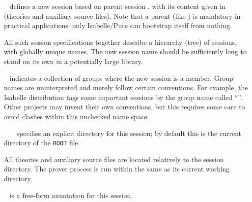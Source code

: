 \begin{isabellebody}
\begin{isamarkuptext}
  \begin{description}

  \item {}~ defines a new
  session  based on parent session , with its
  content given in  (theories and auxiliary source files).
  Note that a parent (like ) is mandatory in practical
  applications: only Isabelle/Pure can bootstrap itself from nothing.

  All such session specifications together describe a hierarchy (tree)
  of sessions, with globally unique names.  The new session name
   should be sufficiently long to stand on its own in a
  potentially large library.

  \item {}~ indicates a
  collection of groups where the new session is a member.  Group names
  are uninterpreted and merely follow certain conventions.  For
  example, the Isabelle distribution tags some important sessions by
  the group name called ``''.  Other projects may invent
  their own conventions, but this requires some care to avoid clashes
  within this unchecked name space.

  \item {}~~~
  specifies an explicit directory for this session; by default this is
  the current directory of the \verb|ROOT| file.

  All theories and auxiliary source files are located relatively to
  the session directory.  The prover process is run within the same as
  its current working directory.

  \item {}~ is a free-form
  annotation for this session.


\end{description}
\end{isamarkuptext}
\end{isabellebody}
